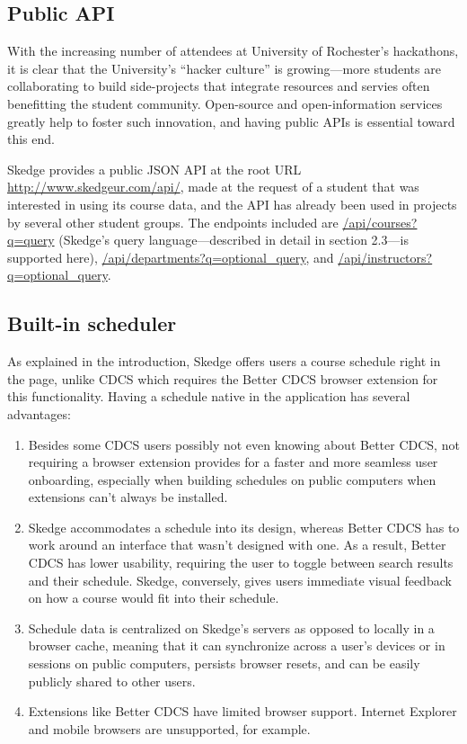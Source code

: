 \subsection{Public API}

With the increasing number of attendees at University of Rochester's hackathons, it is clear that the University's ``hacker culture'' is growing---more students are collaborating to build side-projects that integrate resources and servies often benefitting the student community. Open-source and open-information services greatly help to foster such innovation, and having public APIs is essential toward this end.

Skedge provides a public JSON API at the root URL \url{http://www.skedgeur.com/api/}, made at the request of a student that was interested in using its course data, and the API has already been used in projects by several other student groups. The endpoints included are \url{/api/courses?q=query} (Skedge's query language---described in detail in section 2.3---is supported here), \url{/api/departments?q=optional_query}, and \url{/api/instructors?q=optional_query}.

\subsection{Built-in scheduler}

As explained in the introduction, Skedge offers users a course schedule right in the page, unlike CDCS which requires the Better CDCS browser extension for this functionality. Having a schedule native in the application has several advantages:

\begin{enumerate}
\item Besides some CDCS users possibly not even knowing about Better CDCS, not requiring a browser extension provides for a faster and more seamless user onboarding, especially when building schedules on public computers when extensions can't always be installed.

\item Skedge accommodates a schedule into its design, whereas Better CDCS has to work around an interface that wasn't designed with one. As a result, Better CDCS has lower usability, requiring the user to toggle between search results and their schedule. Skedge, conversely, gives users immediate visual feedback on how a course would fit into their schedule.

\item Schedule data is centralized on Skedge's servers as opposed to locally in a browser cache, meaning that it can synchronize across a user's devices or in sessions on public computers, persists browser resets, and can be easily publicly shared to other users.

\item Extensions like Better CDCS have limited browser support. Internet Explorer and mobile browsers are unsupported, for example.
\end{enumerate}

